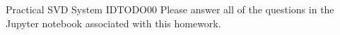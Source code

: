 \begin{problem}{Practical SVD System ID}{TODO}{0}{0}
    Please answer all of the questions in the Jupyter notebook associated with this homework.
\end{problem}